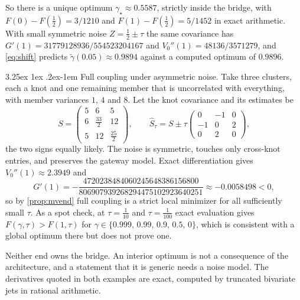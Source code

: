 \documentclass[11pt]{article}
\makeatletter
\renewcommand\paragraph{\@startsection{paragraph}{4}{\z@}%
  {3.25ex \@plus1ex \@minus.2ex}{-1em}%
  {\normalfont\normalsize\itshape}}
\makeatother
\begin{document}
So there is a unique optimum $\gamma_\star\approx0.5587$, strictly inside
the bridge, with $F(0)-F(\tfrac12)=3/1210$ and $F(1)-F(\tfrac12)=5/1452$ in
exact arithmetic. With small symmetric noise $Z=\tfrac12\pm\tau$ the same
covariance has $G'(1)=31779128936/554523204167$ and
$V_0''(1)=48136/3571279$, and \eqref{eq:shift} predicts
$\tilde\gamma(0.05)\approx0.9894$ against a computed optimum of $0.9896$.

\paragraph{Full coupling under asymmetric noise.} Take three clusters, each
a knot and one remaining member that is uncorrelated with everything, with
member variances $1$, $4$ and $8$. Let the knot covariance and its estimates
be
\begin{equation*}
  S=\begin{pmatrix}5&6&5\\6&\tfrac{33}{2}&12\\5&12&\tfrac{25}{2}\end{pmatrix},
  \qquad
  \widehat S_\tau=S\pm\tau\begin{pmatrix}0&-1&0\\-1&0&2\\0&2&0\end{pmatrix},
\end{equation*}
the two signs equally likely. The noise is symmetric, touches only
cross-knot entries, and preserves the gateway model. Exact differentiation
gives $V_0''(1)\approx2.3949$ and
\begin{equation*}
  G'(1)=-\frac{4720238484060245648386156800}{806907939268294475102923640251}
  \approx-0.0058498<0,
\end{equation*}
so by \cref{prop:mvend} full coupling is a strict local minimizer for all
sufficiently small $\tau$. As a spot check, at $\tau=\tfrac1{10}$ and
$\tau=\tfrac1{100}$ exact evaluation gives $F(\gamma,\tau)>F(1,\tau)$ for
$\gamma\in\{0.999,\,0.99,\,0.9,\,0.5,\,0\}$, which is consistent with a
global optimum there but does not prove one.

Neither end owns the bridge. An interior optimum is not a consequence of the
architecture, and a statement that it is generic needs a noise model. The
derivatives quoted in both examples are exact, computed by truncated
bivariate jets in rational arithmetic.
\end{document}
